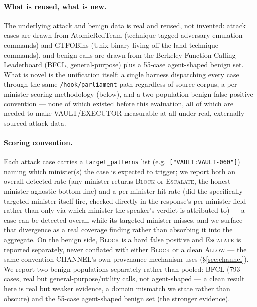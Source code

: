 \documentclass[sigconf,anonymous,review]{acmart}
\begin{document}
\paragraph{What is reused, what is new.} The underlying attack and benign
data is real and reused, not invented: attack cases are drawn from
AtomicRedTeam (technique-tagged adversary emulation commands) and GTFOBins
(Unix binary living-off-the-land technique commands), and benign calls are
drawn from the Berkeley Function-Calling Leaderboard (BFCL, general-purpose)
plus a 55-case agent-shaped benign set. What is novel is the unification
itself: a single harness dispatching every case through the same
\texttt{/hook/parliament} path regardless of source corpus, a per-minister
scoring methodology (below), and a two-population benign false-positive
convention --- none of which existed before this evaluation, all of which are
needed to make VAULT/EXECUTOR measurable at all under real, externally
sourced attack data.

\paragraph{Scoring convention.} Each attack case carries a
\texttt{target\_patterns} list (e.g.\ \texttt{["VAULT:VAULT-060"]}) naming
which minister(s) the case is expected to trigger; we report both an overall
detected rate (any minister returns \textsc{Block} or \textsc{Escalate}, the
honest minister-agnostic bottom line) and a per-minister hit rate (did the
specifically targeted minister itself fire, checked directly in the
response's per-minister field rather than only via which minister the
speaker's verdict is attributed to) --- a case can be detected overall while
its targeted minister misses, and we surface that divergence as a real
coverage finding rather than absorbing it into the aggregate. On the benign
side, \textsc{Block} is a hard false positive and \textsc{Escalate} is
reported separately, never conflated with either \textsc{Block} or a clean
\textsc{Allow} --- the same convention CHANNEL's own provenance mechanism
uses (\S\ref{sec:channel}). We report two benign populations separately
rather than pooled: BFCL (793 cases, real but general-purpose/utility calls,
not agent-shaped --- a clean result here is real but weaker evidence, a
domain mismatch we state rather than obscure) and the 55-case agent-shaped
benign set (the stronger evidence).
\end{document}
